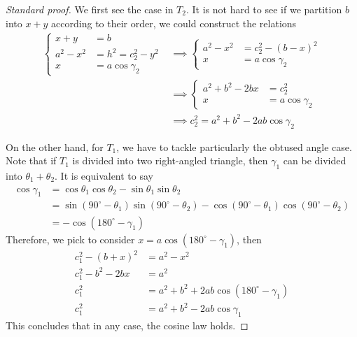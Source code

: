 \documentclass[12pt]{article}
\begin{document}
    \begin{proof}[Standard proof]
        We first see the case in $T_2$. It is not hard to see if we partition $b$ into $x+y$ according to their order, we could construct the relations \begin{align*}
            \begin{cases}
                x+y&=b\\
                a^2-x^2&=h^2=c_2^2-y^2\\
                x&=a\cos{\gamma_2}
            \end{cases}
            &\implies \begin{cases}
                a^2-x^2&=c_2^2-(b-x)^2\\
                x&=a\cos{\gamma_2}
            \end{cases}\\
            &\implies \begin{cases}
                a^2+b^2-2bx&=c_2^2\\
                x&=a\cos{\gamma_2}
            \end{cases}\\
            &\implies c_2^2=a^2+b^2-2ab\cos{\gamma_2}
        \end{align*}

        On the other hand, for $T_1$, we have to tackle particularly the obtused angle case. Note that if $T_1$ is divided into two right-angled triangle, then $\gamma_1$ can be divided into $\theta_1+\theta_2$. It is equivalent to say \begin{align*}
            \cos{\gamma_1}&=\cos{\theta_1}\cos{\theta_2}-\sin{\theta_1}\sin{\theta_2}\\
            &=\sin(90^\circ - \theta_1)\sin(90^\circ - \theta_2) - \cos(90^\circ - \theta_1)\cos(90^\circ - \theta_2)\\
            &=-\cos(180^\circ -\gamma_1)
        \end{align*}
        Therefore, we pick to consider $x=a\cos(180^\circ - \gamma_1)$, then \begin{align*}
            c_1^2 - (b+x)^2 &= a^2-x^2\\
            c_1^2 - b^2 - 2bx &= a^2\\
            c_1^2 &= a^2 + b^2 + 2ab\cos(180^\circ - \gamma_1)\\
            c_1^2 &= a^2 + b^2 - 2ab\cos{\gamma_1}
        \end{align*}
        This concludes that in any case, the cosine law holds.
    \end{proof}
\end{document}
